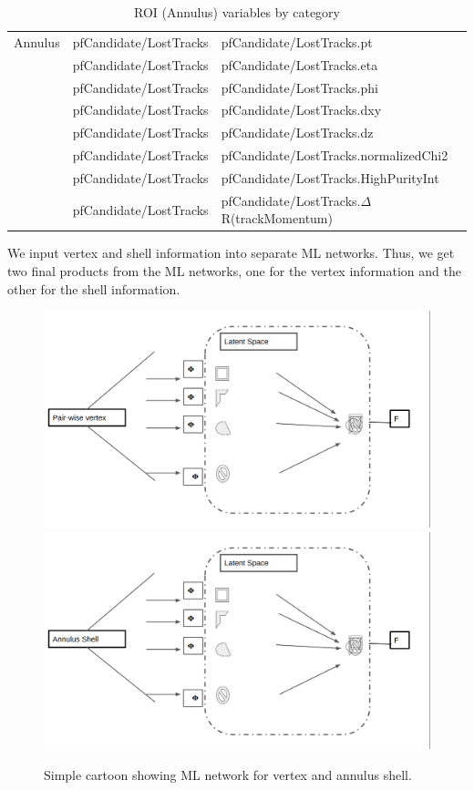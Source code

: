 \begin{table}[htb]
\caption{ROI (Annulus) variables by category}
\begin{center}
\begin{tabular}{r|l|l}\hline
 Annulus      & pfCandidate/LostTracks & pfCandidate/LostTracks.pt \\
              & pfCandidate/LostTracks & pfCandidate/LostTracks.eta \\
              & pfCandidate/LostTracks & pfCandidate/LostTracks.phi \\
              & pfCandidate/LostTracks & pfCandidate/LostTracks.dxy \\
              & pfCandidate/LostTracks & pfCandidate/LostTracks.dz \\
              & pfCandidate/LostTracks & pfCandidate/LostTracks.normalizedChi2 \\
              & pfCandidate/LostTracks & pfCandidate/LostTracks.HighPurityInt \\
              & pfCandidate/LostTracks & pfCandidate/LostTracks.$\Delta$R(trackMomentum) \\
 \hline
 \hline
\end{tabular}
\label{tab:ROIANvars}
\end{center}
\end{table}

We input vertex and shell information into separate ML networks. Thus, we get two final products from the ML networks, one for the vertex information and the other for the shell information.

 \begin{figure}[h!]
   \caption{Simple cartoon showing ML network for vertex and annulus shell.}
   \label{fig:NetworkML}
   \centering
   \includegraphics[width=0.6\linewidth]{figs/PhiVNet.png}
   \includegraphics[width=0.6\linewidth]{figs/PhiANet.png}
 \end{figure}

